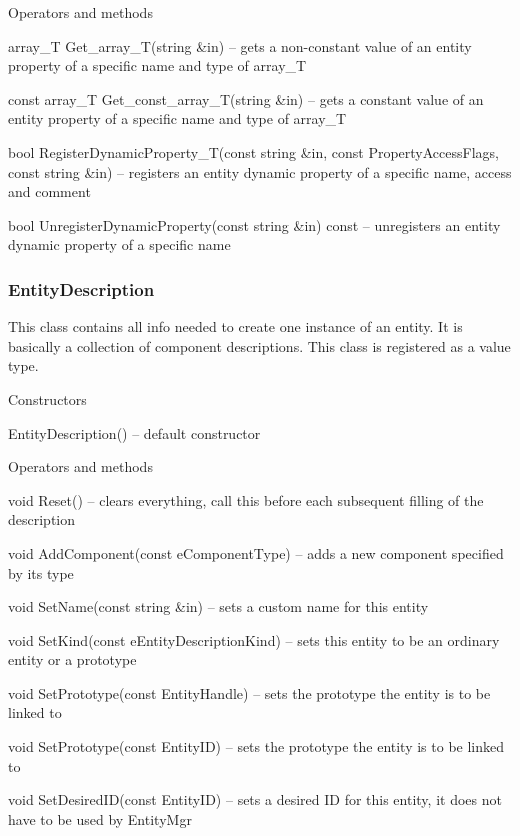 \begin{titled-itemize}{Operators and methods}
  \item array\_T Get\_array\_T(string \&in) -- gets a non-constant value of an entity property of a specific name and type of array\_T
  \item const array\_T Get\_const\_array\_T(string \&in) -- gets a constant value of an entity property of a specific name and type of array\_T
  \item bool RegisterDynamicProperty\_T(const string &in, const PropertyAccessFlags, const string &in) -- registers an entity dynamic property of a specific name, access and comment
  \item bool UnregisterDynamicProperty(const string \&in) const -- unregisters an entity dynamic property of a specific name
\end{titled-itemize}

\subsubsection{EntityDescription}

This class contains all info needed to create one instance of an entity. It is basically a collection of component descriptions. This class is registered as a value type.

\begin{titled-itemize}{Constructors}
  \item EntityDescription() -- default constructor
\end{titled-itemize}

\begin{titled-itemize}{Operators and methods}
  \item void Reset() -- clears everything, call this before each subsequent filling of the description
  \item void AddComponent(const eComponentType) -- adds a new component specified by its type
  \item void SetName(const string \&in) -- sets a custom name for this entity
  \item void SetKind(const eEntityDescriptionKind) -- sets this entity to be an ordinary entity or a prototype
  \item void SetPrototype(const EntityHandle) -- sets the prototype the entity is to be linked to
  \item void SetPrototype(const EntityID) -- sets the prototype the entity is to be linked to
  \item void SetDesiredID(const EntityID) -- sets a desired ID for this entity, it does not have to be used by EntityMgr
\end{titled-itemize}

